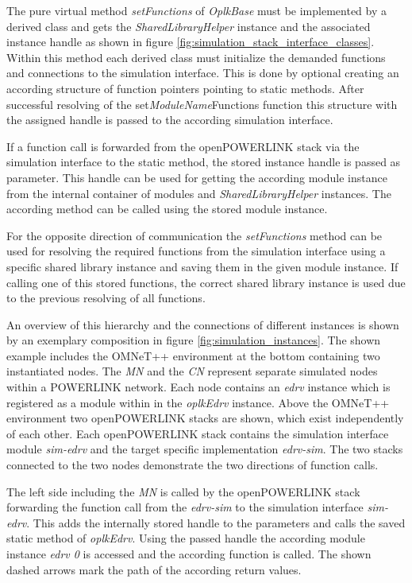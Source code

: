 The pure virtual method \emph{setFunctions} of \emph{OplkBase} must be implemented by a derived class and gets the \emph{SharedLibraryHelper} instance and the associated instance handle as shown in  figure \ref{fig:simulation_stack_interface_classes}.
Within this method each derived class must initialize the demanded functions and connections to the simulation interface.
This is done by optional creating an according structure of function pointers pointing to static methods.
After successful resolving of the set\emph{ModuleName}Functions function this structure with the assigned handle is passed to the according simulation interface.

If a function call is forwarded from the openPOWERLINK stack via the simulation interface to the static method, the stored instance handle is passed as parameter.
This handle can be used for getting the according module instance from the internal container of modules and \emph{SharedLibraryHelper} instances.
The according method can be called using the stored module instance.

For the opposite direction of communication the \emph{setFunctions} method can be used for resolving the required functions from the simulation interface using a specific shared library instance and saving them in the given module instance.
If calling one of this stored functions, the correct shared library instance is used due to the previous resolving of all functions.

An overview of this hierarchy and the connections of different instances is shown by an exemplary composition in figure \ref{fig:simulation_instances}.
The shown example includes the OMNeT++ environment at the bottom containing two instantiated nodes.
The \emph{MN} and the \emph{CN} represent separate simulated nodes within a POWERLINK network.
Each node contains an \emph{edrv} instance which is registered as a module within in the \emph{oplkEdrv} instance.
Above the OMNeT++ environment two openPOWERLINK stacks are shown, which exist independently of each other.
Each openPOWERLINK stack contains the simulation interface module \emph{sim-edrv} and the target specific implementation \emph{edrv-sim}.
The two stacks connected to the two nodes demonstrate the two directions of function calls.

The left side including the \emph{MN} is called by the openPOWERLINK stack forwarding the function call from the \emph{edrv-sim} to the simulation interface \emph{sim-edrv}.
This adds the internally stored handle to the parameters and calls the saved static method of \emph{oplkEdrv}.
Using the passed handle the according module instance \emph{edrv 0} is accessed and the according function is called.
The shown dashed arrows mark the path of the according return values.

